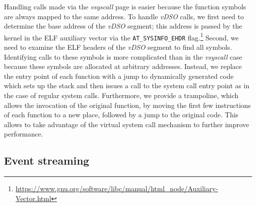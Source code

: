 Handling calls made via the \textit{vsyscall} page is easier because
the function symbols are always mapped to the same address.  
To handle \textit{vDSO} calls, we first need to determine the base
address of the \textit{vDSO} segment; this address is passed by the
kernel in the ELF auxiliary vector via the \lstinline`AT_SYSINFO_EHDR`
flag.\footnote{\url{https://www.gnu.org/software/libc/manual/html_node/Auxiliary-Vector.html}}
Second, we need to examine the ELF headers of the \textit{vDSO}
segment to find all symbols.  Identifying calls to these symbols is
more complicated than in the \textit{vsyscall} case because these
symbols are allocated at arbitrary addresses.  Instead, we replace the
entry point of each function with a jump to dynamically generated code
which sets up the stack and then issues a call to the \varan system
call entry point as in the case of regular system calls. Furthermore, we
provide a trampoline, which allows the invocation of the original
function, by moving the first few instructions of each function to a
new place, followed by a jump to the original code. This allows \varan
to take advantage of the virtual system call mechanism to further
improve performance.




\subsection{Event streaming}
\label{sec:streaming}


